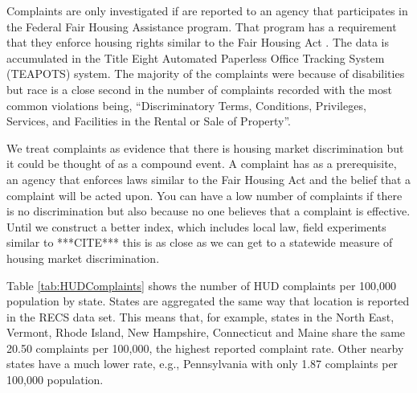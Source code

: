 \documentclass{article}
\begin{document}
Complaints are only investigated if are reported to an agency that participates in the Federal Fair Housing Assistance program.  That program has a requirement that they enforce housing rights similar to the Fair Housing Act \cite[p. 17]{HUD}.  The data is accumulated in the Title Eight Automated Paperless Office Tracking System (TEAPOTS) system.  The majority of the complaints were because of disabilities but race is a close second in the number of complaints recorded \cite[p. 20]{HUD} with the most common violations being, ``Discriminatory Terms, Conditions, Privileges, Services, and Facilities in the Rental or Sale of Property''.

We treat complaints as evidence that there is housing market discrimination but it could be thought of as a compound event.  A complaint has as a prerequisite, an agency that enforces laws similar to the Fair Housing Act and the belief that a complaint will be acted upon.  You can have a low number of complaints if there is no discrimination but also because no one believes that a complaint is effective.  Until we construct a better index, which includes local law, field experiments similar to ***CITE*** this is as close as we can get to a statewide measure of housing market discrimination.
  
  
  
Table \ref{tab:HUDComplaints} shows the number of HUD complaints per 100,000 population by state.  States are aggregated the same way that location is reported in the RECS data set.  This means that, for example, states in the North East, Vermont, Rhode Island, New Hampshire, Connecticut and Maine share the same 20.50 complaints per 100,000, the highest reported complaint rate.  Other nearby states have a much lower rate, e.g., Pennsylvania with only 1.87 complaints per 100,000 population.
\end{document}
